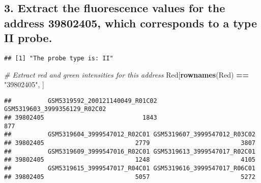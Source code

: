 \documentclass[
]{article}
\newenvironment{Shaded}{\begin{snugshade}}{\end{snugshade}}
\newcommand{\CommentTok}[1]{\textcolor[rgb]{0.56,0.35,0.01}{\textit{#1}}}
\newcommand{\FunctionTok}[1]{\textcolor[rgb]{0.13,0.29,0.53}{\textbf{#1}}}
\newcommand{\NormalTok}[1]{#1}
\newcommand{\OtherTok}[1]{\textcolor[rgb]{0.56,0.35,0.01}{#1}}
\newcommand{\SpecialCharTok}[1]{\textcolor[rgb]{0.81,0.36,0.00}{\textbf{#1}}}
\newcommand{\StringTok}[1]{\textcolor[rgb]{0.31,0.60,0.02}{#1}}
\begin{document}
\subsection{3. Extract the fluorescence values for the address 39802405,
which corresponds to a type II
probe.}\label{extract-the-fluorescence-values-for-the-address-39802405-which-corresponds-to-a-type-ii-probe.}

\begin{Shaded}
\end{Shaded}

\begin{verbatim}
## [1] "The probe type is: II"
\end{verbatim}

\begin{Shaded}
\begin{Highlighting}[]
\CommentTok{\# Extract red and green intensities for this address}
\NormalTok{Red[}\FunctionTok{rownames}\NormalTok{(Red) }\SpecialCharTok{==} \StringTok{"39802405"}\NormalTok{, ]}
\end{Highlighting}
\end{Shaded}

\begin{verbatim}
##          GSM5319592_200121140049_R01C02 GSM5319603_3999356129_R02C02
## 39802405                           1843                          877
##          GSM5319604_3999547012_R02C01 GSM5319607_3999547012_R03C02
## 39802405                         2779                         3807
##          GSM5319609_3999547016_R02C01 GSM5319613_3999547017_R02C01
## 39802405                         1248                         4105
##          GSM5319615_3999547017_R04C01 GSM5319616_3999547017_R06C01
## 39802405                         5057                         5272
\end{verbatim}
\end{document}
